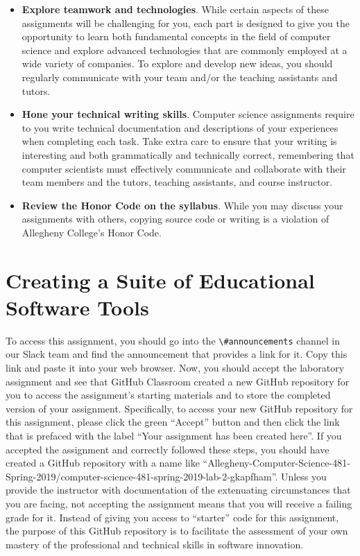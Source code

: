 \documentclass[11pt]{article}
\newcommand{\channel}[1]{\lstinline{#1}}
\begin{document}
\begin{itemize}
\item {\bf Explore teamwork and technologies}. While certain aspects of these
  assignments will be challenging for you, each part is designed to give you the
  opportunity to learn both fundamental concepts in the field of computer
  science and explore advanced technologies that are commonly employed at a wide
  variety of companies. To explore and develop new ideas, you should regularly
  communicate with your team and/or the teaching assistants and tutors.

\item {\bf Hone your technical writing skills}. Computer science assignments
  require to you write technical documentation and descriptions of your
  experiences when completing each task. Take extra care to ensure that your
  writing is interesting and both grammatically and technically correct,
  remembering that computer scientists must effectively communicate and
  collaborate with their team members and the tutors, teaching assistants, and
  course instructor.

\item {\bf Review the Honor Code on the syllabus}. While you may discuss your
  assignments with others, copying source code or writing is a violation of
  Allegheny College's Honor Code.

\end{itemize}

\section*{Creating a Suite of Educational Software Tools}


To access this assignment, you should go into the \channel{\#announcements}
channel in our Slack team and find the announcement that provides a link for it.
Copy this link and paste it into your web browser. Now, you should accept the
laboratory assignment and see that GitHub Classroom created a new GitHub
repository for you to access the assignment's starting materials and to store
the completed version of your assignment. Specifically, to access your new
GitHub repository for this assignment, please click the green ``Accept'' button
and then click the link that is prefaced with the label ``Your assignment has
been created here''. If you accepted the assignment and correctly followed these
steps, you should have created a GitHub repository with a name like
``Allegheny-Computer-Science-481-Spring-2019/computer-science-481-spring-2019-lab-2-gkapfham''.
%
Unless you provide the instructor with documentation of the extenuating
circumstances that you are facing, not accepting the assignment means that you
will receive a failing grade for it.
%
Instead of giving you access to ``starter'' code for this assignment, the
purpose of this GitHub repository is to facilitate the assessment of your own
mastery of the professional and technical skills in software innovation.
\end{document}
